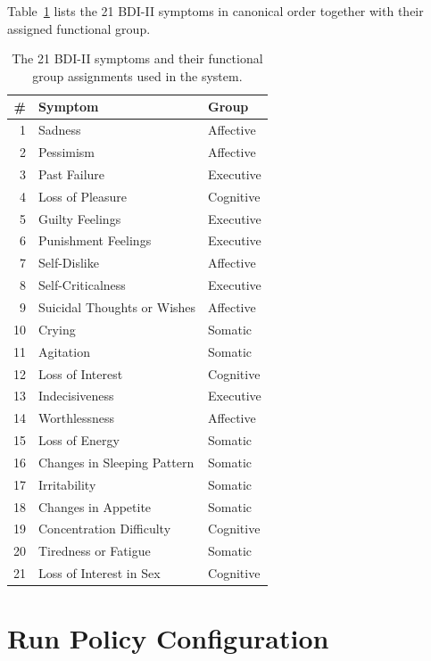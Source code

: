 \documentclass[]{ceurart}
\begin{document}
Table~\ref{tab:bdi} lists the 21 BDI-II symptoms in canonical order together with their assigned functional group.

\begin{table}[t]
\caption{The 21 BDI-II symptoms and their functional group assignments used in the system.}
\label{tab:bdi}
\centering
\small
\begin{tabular}{rll}
\toprule
\textbf{\#} & \textbf{Symptom} & \textbf{Group} \\
\midrule
 1 & Sadness                     & Affective \\
 2 & Pessimism                   & Affective \\
 3 & Past Failure                & Executive \\
 4 & Loss of Pleasure            & Cognitive \\
 5 & Guilty Feelings             & Executive \\
 6 & Punishment Feelings         & Executive \\
 7 & Self-Dislike                & Affective \\
 8 & Self-Criticalness           & Executive \\
 9 & Suicidal Thoughts or Wishes & Affective \\
10 & Crying                      & Somatic \\
11 & Agitation                   & Somatic \\
12 & Loss of Interest            & Cognitive \\
13 & Indecisiveness              & Executive \\
14 & Worthlessness               & Affective \\
15 & Loss of Energy              & Somatic \\
16 & Changes in Sleeping Pattern & Somatic \\
17 & Irritability                & Somatic \\
18 & Changes in Appetite         & Somatic \\
19 & Concentration Difficulty    & Cognitive \\
20 & Tiredness or Fatigue        & Somatic \\
21 & Loss of Interest in Sex     & Cognitive \\
\bottomrule
\end{tabular}
\end{table}

\section{Run Policy Configuration}\label{app:policy}
\end{document}
